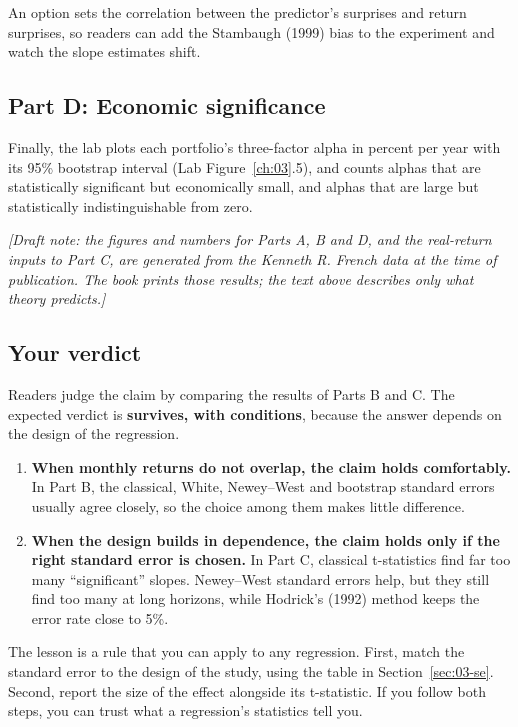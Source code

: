 An option sets the correlation between the predictor's surprises and return surprises, so readers can add the Stambaugh (1999) bias to the experiment and watch the slope estimates shift.

\subsection*{Part D: Economic significance}

Finally, the lab plots each portfolio's three-factor alpha in percent per year with its 95\% bootstrap interval (Lab Figure~\ref{ch:03}.5), and counts alphas that are statistically significant but economically small, and alphas that are large but statistically indistinguishable from zero.

\emph{[Draft note: the figures and numbers for Parts A, B and D, and the real-return inputs to Part C, are generated from the Kenneth R. French data at the time of publication. The book prints those results; the text above describes only what theory predicts.]}

\subsection*{Your verdict}

Readers judge the claim by comparing the results of Parts B and C. The expected verdict is \textbf{survives, with conditions}, because the answer depends on the design of the regression.

\begin{enumerate}
  \item \textbf{When monthly returns do not overlap, the claim holds comfortably.} In Part B, the classical, White, Newey--West and bootstrap standard errors usually agree closely, so the choice among them makes little difference.
  \item \textbf{When the design builds in dependence, the claim holds only if the right standard error is chosen.} In Part C, classical t-statistics find far too many ``significant'' slopes. Newey--West standard errors help, but they still find too many at long horizons, while Hodrick's (1992) method keeps the error rate close to 5\%.
\end{enumerate}

The lesson is a rule that you can apply to any regression. First, match the standard error to the design of the study, using the table in Section~\ref{sec:03-se}. Second, report the size of the effect alongside its t-statistic. If you follow both steps, you can trust what a regression's statistics tell you.



